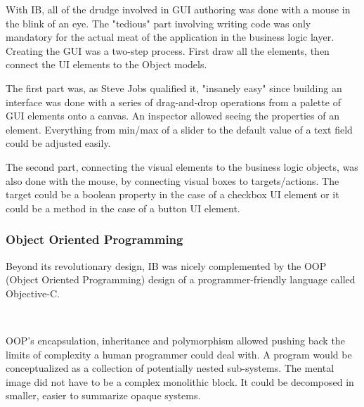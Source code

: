 \vspace{-4mm}
With IB, all of the drudge involved in GUI authoring was done with a mouse in the blink of an eye. The "tedious" part involving writing code was only mandatory for the actual meat of the application in the business logic layer. Creating the GUI was a two-step process. First draw all the elements, then connect the UI elements to the Object models.\\
\par
The first part was, as Steve Jobs qualified it, "insanely easy" since building an interface was done with a series of drag-and-drop operations from a palette of GUI elements onto a canvas. An inspector allowed seeing the properties of an element. Everything from min/max of a slider to the default value of a text field could be adjusted easily.\\
\par
The second part, connecting the visual elements to the business logic objects, was also done with the mouse, by connecting visual boxes to targets/actions. The target could be a boolean property in the case of a checkbox UI element or it could be a method in the case of a button UI element.

\subsubsection{Object Oriented Programming}
Beyond its revolutionary design, IB was nicely complemented by the OOP (Object Oriented Programming) design of a programmer-friendly language called Objective-C.\\
\par
{}\\
\par
OOP's encapsulation, inheritance and polymorphism allowed pushing back the limits of complexity a human programmer could deal with. A program would be conceptualized as a collection of potentially nested sub-systems. The mental image did not have to be a complex monolithic block. It could be decomposed in smaller, easier to summarize opaque systems.\\


